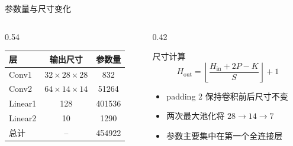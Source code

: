 \documentclass[aspectratio=169,10pt]{ctexbeamer}
\begin{document}
\begin{frame}{参数量与尺寸变化}
	\begin{columns}[T,onlytextwidth]
		\begin{column}{0.54\textwidth}
			\begin{table}
				\centering
				\small
				\begin{tabular}{l c c}
					\toprule
					层 & 输出尺寸 & 参数量 \\
					\midrule
					Conv1 & $32\times28\times28$ & 832 \\
					Conv2 & $64\times14\times14$ & 51264 \\
					Linear1 & 128 & 401536 \\
					Linear2 & 10 & 1290 \\
					\midrule
					总计 & -- & 454922 \\
					\bottomrule
				\end{tabular}
			\end{table}
		\end{column}
		\begin{column}{0.42\textwidth}
			\begin{block}{尺寸计算}
				\[
					H_{\mathrm{out}}=
					\left\lfloor\frac{H_{\mathrm{in}}+2P-K}{S}\right\rfloor+1
				\]
			\end{block}
			\begin{itemize}
				\item padding 2 保持卷积前后尺寸不变
				\item 两次最大池化将 $28\rightarrow14\rightarrow7$
				\item 参数主要集中在第一个全连接层
			\end{itemize}
		\end{column}
	\end{columns}
\end{frame}
\end{document}

